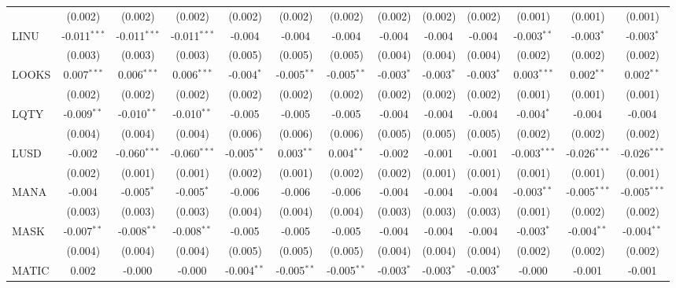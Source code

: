 \begin{table}[!htbp]
\begin{tabular}{@{\extracolsep{5pt}}lcccccccccccc}
  & (0.002) & (0.002) & (0.002) & (0.002) & (0.002) & (0.002) & (0.002) & (0.002) & (0.002) & (0.001) & (0.001) & (0.001) \\
 LINU & -0.011$^{***}$ & -0.011$^{***}$ & -0.011$^{***}$ & -0.004$^{}$ & -0.004$^{}$ & -0.004$^{}$ & -0.004$^{}$ & -0.004$^{}$ & -0.004$^{}$ & -0.003$^{**}$ & -0.003$^{*}$ & -0.003$^{*}$ \\
  & (0.003) & (0.003) & (0.003) & (0.005) & (0.005) & (0.005) & (0.004) & (0.004) & (0.004) & (0.002) & (0.002) & (0.002) \\
 LOOKS & 0.007$^{***}$ & 0.006$^{***}$ & 0.006$^{***}$ & -0.004$^{*}$ & -0.005$^{**}$ & -0.005$^{**}$ & -0.003$^{*}$ & -0.003$^{*}$ & -0.003$^{*}$ & 0.003$^{***}$ & 0.002$^{**}$ & 0.002$^{**}$ \\
  & (0.002) & (0.002) & (0.002) & (0.002) & (0.002) & (0.002) & (0.002) & (0.002) & (0.002) & (0.001) & (0.001) & (0.001) \\
 LQTY & -0.009$^{**}$ & -0.010$^{**}$ & -0.010$^{**}$ & -0.005$^{}$ & -0.005$^{}$ & -0.005$^{}$ & -0.004$^{}$ & -0.004$^{}$ & -0.004$^{}$ & -0.004$^{*}$ & -0.004$^{}$ & -0.004$^{}$ \\
  & (0.004) & (0.004) & (0.004) & (0.006) & (0.006) & (0.006) & (0.005) & (0.005) & (0.005) & (0.002) & (0.002) & (0.002) \\
 LUSD & -0.002$^{}$ & -0.060$^{***}$ & -0.060$^{***}$ & -0.005$^{**}$ & 0.003$^{**}$ & 0.004$^{**}$ & -0.002$^{}$ & -0.001$^{}$ & -0.001$^{}$ & -0.003$^{***}$ & -0.026$^{***}$ & -0.026$^{***}$ \\
  & (0.002) & (0.001) & (0.001) & (0.002) & (0.001) & (0.002) & (0.002) & (0.001) & (0.001) & (0.001) & (0.001) & (0.001) \\
 MANA & -0.004$^{}$ & -0.005$^{*}$ & -0.005$^{*}$ & -0.006$^{}$ & -0.006$^{}$ & -0.006$^{}$ & -0.004$^{}$ & -0.004$^{}$ & -0.004$^{}$ & -0.003$^{**}$ & -0.005$^{***}$ & -0.005$^{***}$ \\
  & (0.003) & (0.003) & (0.003) & (0.004) & (0.004) & (0.004) & (0.003) & (0.003) & (0.003) & (0.001) & (0.002) & (0.002) \\
 MASK & -0.007$^{**}$ & -0.008$^{**}$ & -0.008$^{**}$ & -0.005$^{}$ & -0.005$^{}$ & -0.005$^{}$ & -0.004$^{}$ & -0.004$^{}$ & -0.004$^{}$ & -0.003$^{*}$ & -0.004$^{**}$ & -0.004$^{**}$ \\
  & (0.004) & (0.004) & (0.004) & (0.005) & (0.005) & (0.005) & (0.004) & (0.004) & (0.004) & (0.002) & (0.002) & (0.002) \\
 MATIC & 0.002$^{}$ & -0.000$^{}$ & -0.000$^{}$ & -0.004$^{**}$ & -0.005$^{**}$ & -0.005$^{**}$ & -0.003$^{*}$ & -0.003$^{*}$ & -0.003$^{*}$ & -0.000$^{}$ & -0.001$^{}$ & -0.001$^{}$ \\

\end{tabular}
\end{table}
